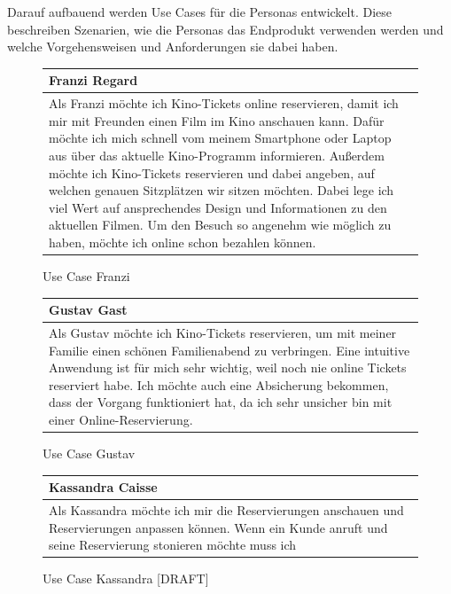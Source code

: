 		Darauf aufbauend werden Use Cases für die Personas entwickelt. Diese beschreiben Szenarien, wie die Personas das Endprodukt verwenden werden und welche Vorgehensweisen und Anforderungen sie dabei haben. 
		
		\begin{figure}[H]
			\begin{tabular}{p{13cm}}
				\textbf{Franzi Regard} \\\toprule
				Als Franzi möchte ich Kino-Tickets online reservieren, damit ich mir mit Freunden einen Film im Kino anschauen kann. Dafür möchte ich mich schnell vom meinem Smartphone oder Laptop aus über das aktuelle Kino-Programm informieren. Außerdem möchte ich Kino-Tickets reservieren und dabei angeben, auf welchen genauen Sitzplätzen wir sitzen möchten. Dabei lege ich viel Wert auf ansprechendes Design und Informationen zu den aktuellen Filmen. Um den Besuch so angenehm wie möglich zu haben, möchte ich online schon bezahlen können.
			\end{tabular}
			\caption[Use Case Franzi]{\label{fig:useCaseFranzi} Use Case Franzi}
		\end{figure}
	
		\begin{figure}[H]
			\begin{tabular}{p{13cm}}
				\textbf{Gustav Gast} \\\toprule
				Als Gustav möchte ich Kino-Tickets reservieren, um mit meiner Familie einen schönen Familienabend zu verbringen. Eine intuitive Anwendung ist für mich sehr wichtig, weil noch nie online Tickets reserviert habe. Ich möchte auch eine Absicherung bekommen, dass der Vorgang funktioniert hat, da ich sehr unsicher bin mit einer Online-Reservierung.
			\end{tabular}
			\caption[Use Case Gustav]{\label{fig:useCaseGustav} Use Case Gustav}
		\end{figure}
	
		\begin{figure}[H]
			\begin{tabular}{p{13cm}}
				\textbf{Kassandra Caisse} \\\toprule
				Als Kassandra möchte ich mir die Reservierungen anschauen und Reservierungen anpassen können. Wenn ein Kunde anruft und seine Reservierung stonieren möchte muss ich  
			\end{tabular}
			\caption[Use Case Kassandra]{\label{fig:useCaseKassandra} Use Case Kassandra [DRAFT]}
		\end{figure}

